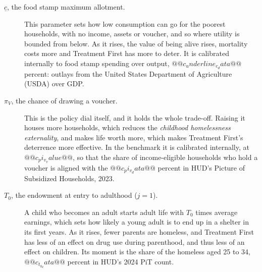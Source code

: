 \documentclass[10pt]{article}
\begin{document}
\begin{description}
\item[$\underline c$, the food stamp maximum allotment.] This parameter sets how low consumption can go for the poorest households, with no income, assets or voucher, and so where utility is bounded from below. As it rises, the value of being alive rises, mortality costs more and Treatment First has more to deter. It is calibrated internally to food stamp spending over output, $@@c_underline_c_data@@$ percent: outlays from the United States Department of Agriculture (USDA) over GDP.
\item[$\pi_V$, the chance of drawing a voucher.] This is the policy dial itself, and it holds the whole trade-off. Raising it houses more households, which reduces the \emph{childhood homelessness externality}, and makes life worth more, which makes Treatment First's deterrence more effective. In the benchmark it is calibrated internally, at $@@c_pi_v_value@@$, so that the share of income-eligible households who hold a voucher is aligned with the $@@c_pi_v_data@@$ percent in HUD's Picture of Subsidized Households, 2023.
\item[$T_0$, the endowment at entry to adulthood ($j=1$).] A child who becomes an adult starts adult life with $T_0$ times average earnings, which sets how likely a young adult is to end up in a shelter in its first years.   As it rises, fewer parents are homeless, and Treatment First has less of an effect on drug use during parenthood, and thus less of an effect on children. Its moment is the share of the homeless aged 25 to 34, $@@c_t_0_data@@$ percent in HUD's 2024 PiT count.
\end{description}
\end{document}

